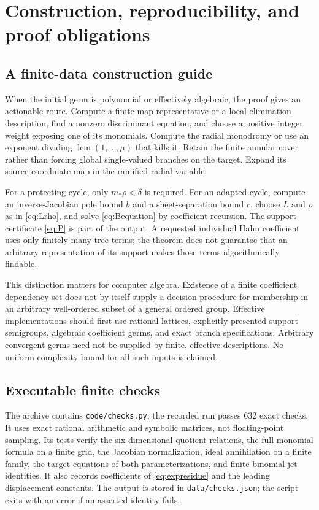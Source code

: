 \documentclass[11pt,letterpaper]{article}
\theoremstyle{definition}
\theoremstyle{remark}
\numberwithin{equation}{section}
\begin{document}
\section{Construction, reproducibility, and proof obligations}
\label{sec:implementation}

\subsection{A finite-data construction guide}
When the initial germ is polynomial or effectively algebraic, the proof gives
an actionable route. Compute a finite-map representative or a local
elimination description, find a nonzero discriminant equation, and choose a
positive integer weight exposing one of its monomials. Compute the radial
monodromy or use an exponent dividing
$\operatorname{lcm}(1,\ldots,\mu)$ that kills it. Retain the finite
annular cover rather than forcing global single-valued branches on the target.
Expand its source-coordinate map in the ramified radial variable.

For a protecting cycle, only $m_*\rho<\delta$ is required. For an adapted
cycle, compute an inverse-Jacobian pole bound $b$ and a sheet-separation bound
$c$, choose $L$ and $\rho$ as in \eqref{eq:Lrho}, and solve
\eqref{eq:Bequation} by coefficient recursion. The support certificate
\eqref{eq:P} is part of the output. A requested individual Hahn coefficient
uses only finitely many tree terms; the theorem does not guarantee that an
arbitrary representation of its support makes those terms algorithmically
findable.

This distinction matters for computer algebra. Existence of a finite
coefficient dependency set does not by itself supply a decision procedure for
membership in an arbitrary well-ordered subset of a general ordered group.
Effective implementations should first use rational lattices, explicitly
presented support semigroups, algebraic coefficient germs, and exact branch
specifications. Arbitrary convergent germs need not be supplied by finite,
effective descriptions. No uniform complexity bound for all such inputs is
claimed.

\subsection{Executable finite checks}
The archive contains \texttt{code/checks.py}; the recorded run passes
632 exact checks. It uses exact rational
arithmetic and symbolic matrices, not floating-point sampling. Its tests
verify the six-dimensional quotient relations, the full monomial formula on
a finite grid, the Jacobian normalization, ideal annihilation on a finite
family, the target equations of both parameterizations, and finite binomial
jet identities. It also records coefficients of \eqref{eq:expresidue} and
the leading displacement constants. The output is stored in
\texttt{data/checks.json}; the script exits with an error if an asserted
identity fails.
\end{document}

